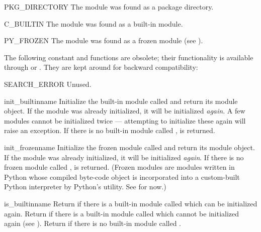 \begin{datadesc}{PKG_DIRECTORY}
The module was found as a package directory.
\end{datadesc}

\begin{datadesc}{C_BUILTIN}
The module was found as a built-in module.
\end{datadesc}

\begin{datadesc}{PY_FROZEN}
The module was found as a frozen module (see ).
\end{datadesc}

The following constant and functions are obsolete; their functionality
is available through  or .
They are kept around for backward compatibility:

\begin{datadesc}{SEARCH_ERROR}
Unused.
\end{datadesc}

\begin{funcdesc}{init_builtin}{name}
Initialize the built-in module called  and return its module
object.  If the module was already initialized, it will be initialized
\emph{again}.  A few modules cannot be initialized twice --- attempting
to initialize these again will raise an 
exception.  If there is no
built-in module called ,  is returned.
\end{funcdesc}

\begin{funcdesc}{init_frozen}{name}
Initialize the frozen module called  and return its module
object.  If the module was already initialized, it will be initialized
\emph{again}.  If there is no frozen module called ,
 is returned.  (Frozen modules are modules written in
Python whose compiled byte-code object is incorporated into a
custom-built Python interpreter by Python's  utility.
See  for now.)
\end{funcdesc}

\begin{funcdesc}{is_builtin}{name}
Return  if there is a built-in module called  which
can be initialized again.  Return  if there is a built-in
module called  which cannot be initialized again (see
).  Return  if there is no built-in
module called .
\end{funcdesc}

